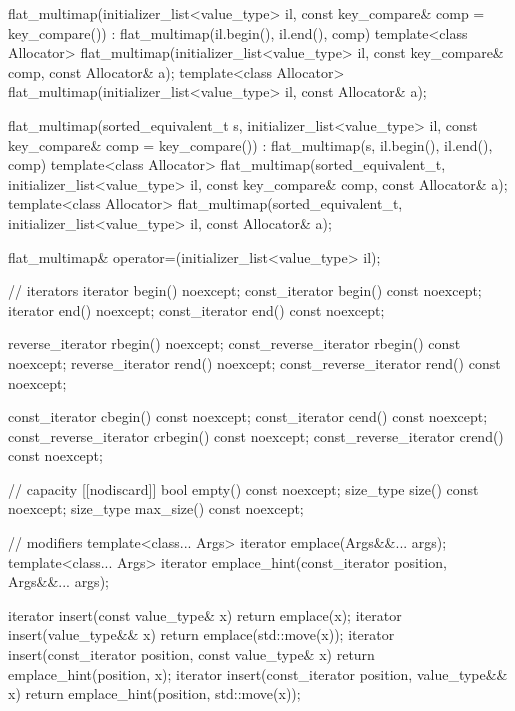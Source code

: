 \begin{codeblock}
{{    flat_multimap(initializer_list<value_type> il, const key_compare& comp = key_compare())
        : flat_multimap(il.begin(), il.end(), comp) { }
    template<class Allocator>
      flat_multimap(initializer_list<value_type> il, const key_compare& comp,
                    const Allocator& a);
    template<class Allocator>
      flat_multimap(initializer_list<value_type> il, const Allocator& a);

    flat_multimap(sorted_equivalent_t s, initializer_list<value_type> il,
                  const key_compare& comp = key_compare())
        : flat_multimap(s, il.begin(), il.end(), comp) { }
    template<class Allocator>
      flat_multimap(sorted_equivalent_t, initializer_list<value_type> il,
                    const key_compare& comp, const Allocator& a);
    template<class Allocator>
      flat_multimap(sorted_equivalent_t, initializer_list<value_type> il, const Allocator& a);

    flat_multimap& operator=(initializer_list<value_type> il);

    // iterators
    iterator               begin() noexcept;
    const_iterator         begin() const noexcept;
    iterator               end() noexcept;
    const_iterator         end() const noexcept;

    reverse_iterator       rbegin() noexcept;
    const_reverse_iterator rbegin() const noexcept;
    reverse_iterator       rend() noexcept;
    const_reverse_iterator rend() const noexcept;

    const_iterator         cbegin() const noexcept;
    const_iterator         cend() const noexcept;
    const_reverse_iterator crbegin() const noexcept;
    const_reverse_iterator crend() const noexcept;

    // capacity
    [[nodiscard]] bool empty() const noexcept;
    size_type size() const noexcept;
    size_type max_size() const noexcept;

    // modifiers
    template<class... Args> iterator emplace(Args&&... args);
    template<class... Args>
      iterator emplace_hint(const_iterator position, Args&&... args);

    iterator insert(const value_type& x)
      { return emplace(x); }
    iterator insert(value_type&& x)
      { return emplace(std::move(x)); }
    iterator insert(const_iterator position, const value_type& x)
      { return emplace_hint(position, x); }
    iterator insert(const_iterator position, value_type&& x)
      { return emplace_hint(position, std::move(x)); }

}}
\end{codeblock}
